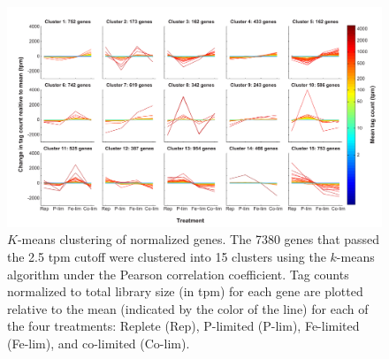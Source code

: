 \begin{landscape}
   \null         %
   \vfill        %
    
    \begin{figure}
    \centering
        \includegraphics[width=1\textwidth]{Images/C2_FigureS2_v6.pdf}
        \caption[$K$-means clustering of normalized genes]{$K$-means clustering of normalized genes. The 7380 genes that passed the 2.5 tpm cutoff were clustered into 15 clusters using the $k$-means algorithm under the Pearson correlation coefficient. Tag counts normalized to total library size (in tpm) for each gene are plotted relative to the mean (indicated by the color of the line) for each of the four treatments: Replete (Rep), P-limited (P-lim), Fe-limited (Fe-lim), and co-limited (Co-lim).}
    \label{fig:a1f2} 
    \end{figure}
    \vfill        %
\end{landscape}

\clearpage
\newpage
